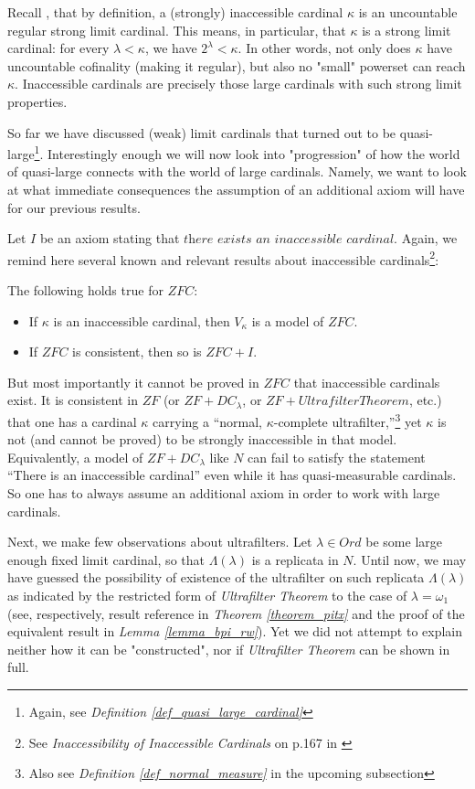 Recall \cite{jech2003set}, that by definition, a (strongly) inaccessible cardinal $\kappa$ is an uncountable regular strong limit cardinal. This means, in particular, that $\kappa$ is a strong limit cardinal: for every $\lambda < \kappa$, we have $2^\lambda < \kappa$. In other words, not only does $\kappa$ have uncountable cofinality (making it regular), but also no "small" powerset can reach $\kappa$. Inaccessible cardinals are precisely those large cardinals with such strong limit properties.

So far we have discussed (weak) limit cardinals that turned out to be quasi-large\footnote{Again, see \textit{Definition \ref{def_quasi_large_cardinal}}}. Interestingly enough we will now look into "progression" of how the world of quasi-large connects with the world of large cardinals. Namely, we want to look at what immediate consequences the assumption of an additional axiom will have for our previous results.

Let $I$ be an axiom stating that $\textit{there exists an inaccessible cardinal}$. Again, we remind here several known and relevant results about inaccessible cardinals\footnote{See \textit{Inaccessibility of Inaccessible Cardinals} on p.167 in \cite{jech2003set}}:

\begin{lemma}
    The following holds true for $ZFC$:
    \begin{itemize}
        \item If $\kappa$ is an inaccessible cardinal, then $V_\kappa$ is a model of $ZFC$.
        \item If $ZFC$ is consistent, then so is $ZFC + I$.
    \end{itemize}
\end{lemma}

But most importantly it cannot be proved in $ZFC$ that inaccessible cardinals exist. It is consistent in $ZF$ (or $ZF + DC_\lambda$, or $ZF + UltrafilterTheorem$, etc.) that one has a cardinal $\kappa$ carrying a “normal, $\kappa$-complete ultrafilter,”\footnote{Also see \textit{Definition \ref{def_normal_measure}} in the upcoming subsection} yet $\kappa$ is not (and cannot be proved) to be strongly inaccessible in that model. Equivalently, a model of $ZF+DC_\lambda$ like $N$ can fail to satisfy the statement “There is an inaccessible cardinal” even while it has quasi-measurable cardinals. So one has to always assume an additional axiom in order to work with large cardinals. 

Next, we make few observations about ultrafilters. Let $\lambda \in Ord$ be some large enough fixed limit cardinal, so that $\Lambda(\lambda)$ is a replicata in $N$. Until now, we may have guessed the possibility of existence of the ultrafilter on such replicata $\Lambda(\lambda)$ as indicated by the restricted form of \textit{Ultrafilter Theorem} to the case of $\lambda = \omega_1$ (see, respectively, result reference in \textit{Theorem \ref{theorem_pitx}} and the proof of the equivalent result in \textit{Lemma \ref{lemma_bpi_rw}}). Yet we did not attempt to explain neither how it can be "constructed", nor if \textit{Ultrafilter Theorem} can be shown in full.

